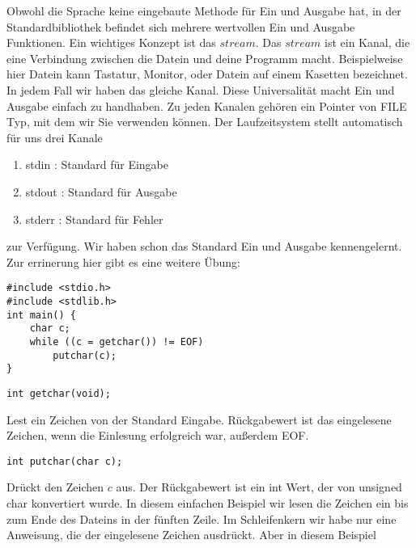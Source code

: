 \documentclass{article}[12pt]
\newenvironment{myexampleblock}[1]{%
    \tcolorbox[beamer,%
    noparskip,breakable,
    colback=White,colframe=ForestGreen,%
    colbacklower=LimeGreen!75!White,%
    title=#1]}%
    {\endtcolorbox}
\newenvironment{myexampleprogram}[1]{%
    \tcolorbox[beamer,%
    noparskip,breakable,
    colback=White,colframe=Goldenrod,%
    colbacklower=Yellow!75!White,%
    title=#1]}%
    {\endtcolorbox}
\begin{document}
Obwohl die Sprache keine eingebaute Methode für Ein und Ausgabe hat, in der Standardbibliothek befindet sich
mehrere wertvollen Ein und Ausgabe Funktionen. Ein wichtiges Konzept ist das $stream$. Das $stream$ ist ein Kanal, die
eine Verbindung zwischen die Datein und deine Programm macht. Beispielweise hier Datein kann  Tastatur, 
Monitor, oder Datein auf einem Kasetten bezeichnet. In jedem Fall wir haben das gleiche Kanal.
Diese Universalität macht Ein und Ausgabe einfach zu handhaben. Zu jeden Kanalen gehören ein Pointer von FILE Typ,
mit dem wir Sie verwenden können. Der Laufzeitsystem stellt automatisch für uns drei Kanale
\begin{enumerate}
\item stdin : Standard für Eingabe 
\item stdout : Standard für Ausgabe
\item stderr : Standard für Fehler
\end{enumerate} zur Verfügung. Wir haben schon das Standard Ein und Ausgabe kennengelernt. Zur errinerung hier gibt es
eine weitere Übung:
\begin{myexampleprogram}{Programme: \texttt{Eingabe nach Ausgabe Kopieren}}
\begin{lstlisting}
#include <stdio.h>
#include <stdlib.h>
int main() {
    char c;
    while ((c = getchar()) != EOF)
        putchar(c);
}
\end{lstlisting}
\end{myexampleprogram}
\begin{myexampleblock}{Funktion: \texttt{getchar}}
\begin{lstlisting}
int getchar(void);
\end{lstlisting}
\vspace{-0.4cm}
Lest ein Zeichen von der Standard Eingabe. Rückgabewert ist das eingelesene Zeichen, wenn die Einlesung erfolgreich war, außerdem
EOF.
\end{myexampleblock}
\begin{myexampleblock}{Funktion: \texttt{putchar}}
\begin{lstlisting}
int putchar(char c);
\end{lstlisting}
\vspace{-0.4cm}
Drückt den Zeichen $c$ aus. Der Rückgabewert ist ein int Wert, der von unsigned char konvertiert wurde.
\end{myexampleblock}
In diesem einfachen Beispiel wir lesen die Zeichen ein bis zum Ende des Dateins in der fünften Zeile.
Im Schleifenkern wir habe nur eine Anweisung, die der eingelesene Zeichen ausdrückt. Aber in diesem Beispiel
\end{document}
